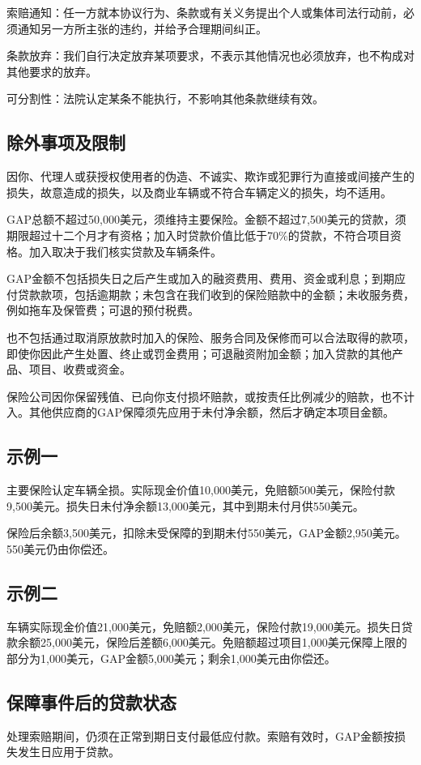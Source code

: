\documentclass[UTF8,fontset=none,11pt,a4paper]{ctexart}
\begin{document}
索赔通知：任一方就本协议行为、条款或有关义务提出个人或集体司法行动前，必须通知另一方所主张的违约，并给予合理期间纠正。


条款放弃：我们自行决定放弃某项要求，不表示其他情况也必须放弃，也不构成对其他要求的放弃。


可分割性：法院认定某条不能执行，不影响其他条款继续有效。


\subsection*{除外事项及限制}
因你、代理人或获授权使用者的伪造、不诚实、欺诈或犯罪行为直接或间接产生的损失，故意造成的损失，以及商业车辆或不符合车辆定义的损失，均不适用。


GAP总额不超过50,000美元，须维持主要保险。金额不超过7,500美元的贷款，须期限超过十二个月才有资格；加入时贷款价值比低于70\%的贷款，不符合项目资格。加入取决于我们核实贷款及车辆条件。


GAP金额不包括损失日之后产生或加入的融资费用、费用、资金或利息；到期应付贷款款项，包括逾期款；未包含在我们收到的保险赔款中的金额；未收服务费，例如拖车及保管费；可退的预付税费。


也不包括通过取消原放款时加入的保险、服务合同及保修而可以合法取得的款项，即使你因此产生处置、终止或罚金费用；可退融资附加金额；加入贷款的其他产品、项目、收费或资金。


保险公司因你保留残值、已向你支付损坏赔款，或按责任比例减少的赔款，也不计入。其他供应商的GAP保障须先应用于未付净余额，然后才确定本项目金额。


\subsection*{示例一}
主要保险认定车辆全损。实际现金价值10,000美元，免赔额500美元，保险付款9,500美元。损失日未付净余额13,000美元，其中到期未付月供550美元。


保险后余额3,500美元，扣除未受保障的到期未付550美元，GAP金额2,950美元。550美元仍由你偿还。


\subsection*{示例二}
车辆实际现金价值21,000美元，免赔额2,000美元，保险付款19,000美元。损失日贷款余额25,000美元，保险后差额6,000美元。免赔额超过项目1,000美元保障上限的部分为1,000美元，GAP金额5,000美元；剩余1,000美元由你偿还。


\subsection*{保障事件后的贷款状态}
处理索赔期间，仍须在正常到期日支付最低应付款。索赔有效时，GAP金额按损失发生日应用于贷款。
\end{document}
